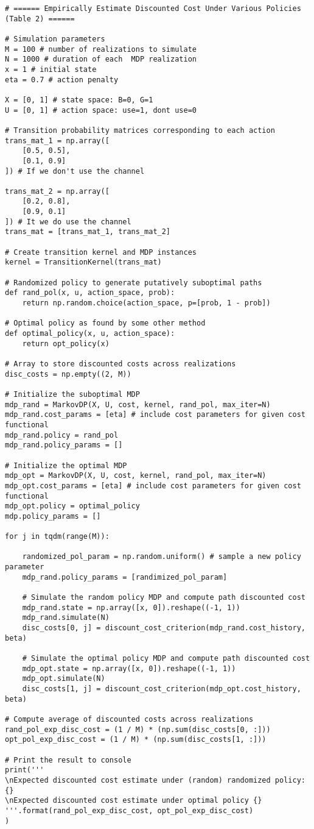 \documentclass[10pt]{article}
\newcommand{\1}[1]{\mathbbm{1}_{#1}}
\begin{document}
    \begin{verbatim}
# ====== Empirically Estimate Discounted Cost Under Various Policies (Table 2) ======

# Simulation parameters
M = 100 # number of realizations to simulate
N = 1000 # duration of each  MDP realization
x = 1 # initial state
eta = 0.7 # action penalty

X = [0, 1] # state space: B=0, G=1 
U = [0, 1] # action space: use=1, dont use=0

# Transition probability matrices corresponding to each action
trans_mat_1 = np.array([
    [0.5, 0.5],
    [0.1, 0.9]
]) # If we don't use the channel

trans_mat_2 = np.array([
    [0.2, 0.8],
    [0.9, 0.1]
]) # It we do use the channel
trans_mat = [trans_mat_1, trans_mat_2]

# Create transition kernel and MDP instances
kernel = TransitionKernel(trans_mat)

# Randomized policy to generate putatively suboptimal paths
def rand_pol(x, u, action_space, prob):
    return np.random.choice(action_space, p=[prob, 1 - prob])

# Optimal policy as found by some other method
def optimal_policy(x, u, action_space):
    return opt_policy(x)

# Array to store discounted costs across realizations
disc_costs = np.empty((2, M))

# Initialize the suboptimal MDP
mdp_rand = MarkovDP(X, U, cost, kernel, rand_pol, max_iter=N)
mdp_rand.cost_params = [eta] # include cost parameters for given cost functional
mdp_rand.policy = rand_pol
mdp_rand.policy_params = []

# Initialize the optimal MDP
mdp_opt = MarkovDP(X, U, cost, kernel, rand_pol, max_iter=N)
mdp_opt.cost_params = [eta] # include cost parameters for given cost functional
mdp_opt.policy = optimal_policy
mdp.policy_params = []

for j in tqdm(range(M)):

    randomized_pol_param = np.random.uniform() # sample a new policy parameter
    mdp_rand.policy_params = [randimized_pol_param]

    # Simulate the random policy MDP and compute path discounted cost
    mdp_rand.state = np.array([x, 0]).reshape((-1, 1))
    mdp_rand.simulate(N)
    disc_costs[0, j] = discount_cost_criterion(mdp_rand.cost_history, beta)

    # Simulate the optimal policy MDP and compute path discounted cost
    mdp_opt.state = np.array([x, 0]).reshape((-1, 1))
    mdp_opt.simulate(N)
    disc_costs[1, j] = discount_cost_criterion(mdp_opt.cost_history, beta)

# Compute average of discounted costs across realizations
rand_pol_exp_disc_cost = (1 / M) * (np.sum(disc_costs[0, :]))
opt_pol_exp_disc_cost = (1 / M) * (np.sum(disc_costs[1, :]))

# Print the result to console
print('''
\nExpected discounted cost estimate under (random) randomized policy: {}
\nExpected discounted cost estimate under optimal policy {}
'''.format(rand_pol_exp_disc_cost, opt_pol_exp_disc_cost)
)
    \end{verbatim}
\end{document}
